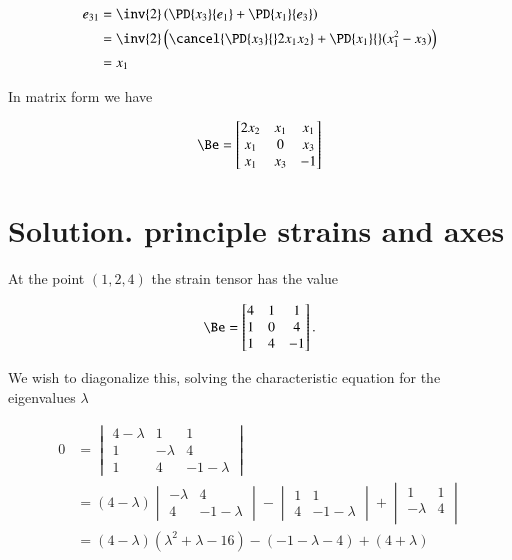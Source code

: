 \begin{align*}
e_{31}
&=
\inv{2} \left(
\PD{x_3}{e_1}
+
\PD{x_1}{e_3}
\right) \\
&=
\inv{2}
\left(
\cancel{\PD{x_3}{} 2 x_1 x_2 }
+
\PD{x_1}{} (x_1^2 - x_3 )
\right) \\
&=
x_1
\end{align*}

In matrix form we have

\begin{equation}\label{eqn:continuumProblemSet1:250}
\Be =
\begin{bmatrix}
2 x_2 & x_1 & x_1 \\
x_1 & 0 & x_3 \\
x_1 & x_3 & -1 \\
\end{bmatrix}
\end{equation}

\section{Solution.  principle strains and axes}

At the point $(1, 2, 4)$ the strain tensor has the value

\begin{equation}\label{eqn:continuumProblemSet1:270}
\Be =
\begin{bmatrix}
4 & 1 & 1 \\
1 & 0 & 4 \\
1 & 4 & -1
\end{bmatrix}.
\end{equation}

We wish to diagonalize this, solving the characteristic equation for the eigenvalues $\lambda$

\begin{align*}
0 &=
\begin{vmatrix}
4 -\lambda & 1 & 1 \\
1 & -\lambda & 4 \\
1 & 4 & -1 -\lambda
\end{vmatrix} \\
&=
(4 -\lambda )
\begin{vmatrix}
 -\lambda & 4 \\
 4 & -1 -\lambda
\end{vmatrix}
-
\begin{vmatrix}
1 & 1 \\
4 & -1 -\lambda
\end{vmatrix}
+
\begin{vmatrix}
1 & 1 \\
-\lambda & 4 \\
\end{vmatrix} \\
&=
(4 - \lambda)(\lambda^2 + \lambda - 16)
-(-1 -\lambda - 4)
+(4 + \lambda) \\
\end{align*}

